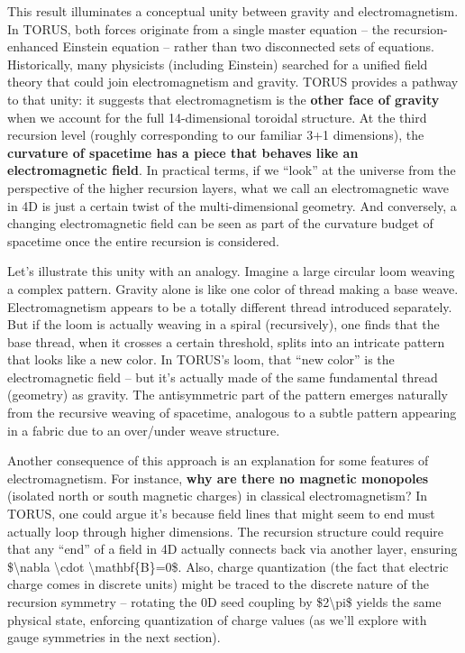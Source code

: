 \documentclass[]{article}
\begin{document}
This result illuminates a conceptual unity between gravity and
electromagnetism. In TORUS, both forces originate from a single master
equation -- the recursion-enhanced Einstein equation -- rather than two
disconnected sets of equations. Historically, many physicists (including
Einstein) searched for a unified field theory that could join
electromagnetism and gravity. TORUS provides a pathway to that unity: it
suggests that electromagnetism is the \textbf{other face of gravity}
when we account for the full 14-dimensional toroidal structure. At the
third recursion level (roughly corresponding to our familiar 3+1
dimensions), the \textbf{curvature of spacetime has a piece that behaves
like an electromagnetic field}​. In practical terms, if we ``look'' at
the universe from the perspective of the higher recursion layers, what
we call an electromagnetic wave in 4D is just a certain twist of the
multi-dimensional geometry. And conversely, a changing electromagnetic
field can be seen as part of the curvature budget of spacetime once the
entire recursion is considered.

Let's illustrate this unity with an analogy. Imagine a large circular
loom weaving a complex pattern. Gravity alone is like one color of
thread making a base weave. Electromagnetism appears to be a totally
different thread introduced separately. But if the loom is actually
weaving in a spiral (recursively), one finds that the base thread, when
it crosses a certain threshold, splits into an intricate pattern that
looks like a new color. In TORUS's loom, that ``new color'' is the
electromagnetic field -- but it's actually made of the same fundamental
thread (geometry) as gravity. The antisymmetric part of the pattern
emerges naturally from the recursive weaving of spacetime, analogous to
a subtle pattern appearing in a fabric due to an over/under weave
structure.

Another consequence of this approach is an explanation for some features
of electromagnetism. For instance, \textbf{why are there no magnetic
monopoles} (isolated north or south magnetic charges) in classical
electromagnetism? In TORUS, one could argue it's because field lines
that might seem to end must actually loop through higher dimensions. The
recursion structure could require that any ``end'' of a field in 4D
actually connects back via another layer, ensuring
\$\textbackslash{}nabla \textbackslash{}cdot
\textbackslash{}mathbf\{B\}=0\$​. Also, charge quantization (the fact
that electric charge comes in discrete units) might be traced to the
discrete nature of the recursion symmetry -- rotating the 0D seed
coupling by \$2\textbackslash{}pi\$ yields the same physical state,
enforcing quantization of charge values (as we'll explore with gauge
symmetries in the next section).
\end{document}
